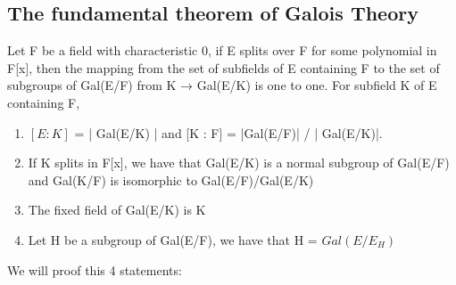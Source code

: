 \documentclass[a4paper, 10pt]{article}
\theoremstyle{plain}
\theoremstyle{definition}
\theoremstyle{remark}
\begin{document}
	\subsection{The fundamental theorem of Galois Theory}
	Let F be a field with characteristic 0, if E splits over F for some polynomial in F[x], then the mapping from the
set of subfields of E containing F to the set of subgroups of Gal(E/F) from K → Gal(E/K) is one to one.
For subfield K of E containing F,
	
	\begin{enumerate}
		\item $[E : K]$  = | Gal(E/K) | and [K : F] = |Gal(E/F)| / | Gal(E/K)|.
		\item If  K splits in F[x], we have that Gal(E/K) is a normal subgroup of Gal(E/F) and Gal(K/F) is
isomorphic to Gal(E/F)/Gal(E/K)
		\item The fixed field of Gal(E/K) is K
		\item Let H be a subgroup of Gal(E/F), we have that H = $Gal(E/E_H)$
	\end{enumerate}

We will proof this 4 statements:
\end{document}
